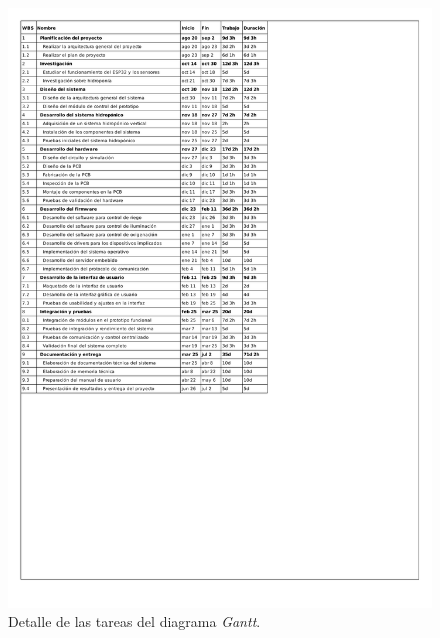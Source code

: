\documentclass[
11pt, %
]{charter}
\begin{document}
\begin{figure}[htpb]
\centering 
\includegraphics[trim=0 300 0 0, clip,width=\linewidth, height=0.97\textheight]{./Figuras/tareas.pdf}
\caption{Detalle de las tareas del diagrama \textit{Gantt}.} %
\label{fig:diagGantt}
\end{figure}
\end{document}
